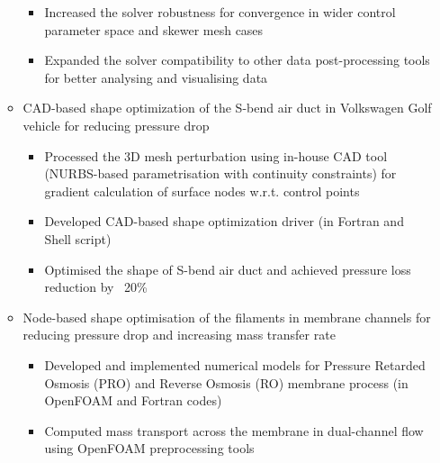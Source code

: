 \documentclass[letterpaper]{article}
\begin{document}
\begin{itemize}
\begin{itemize}
\begin{itemize}
		\item Increased the solver robustness for convergence in wider control parameter space and skewer mesh cases
		\item Expanded the solver compatibility to other data post-processing tools for better analysing and visualising data
		\end{itemize}
		\item CAD-based shape optimization of the S-bend air duct in Volkswagen Golf vehicle for reducing pressure drop
		\begin{itemize}
		\item Processed the 3D mesh perturbation using in-house CAD tool (NURBS-based parametrisation with continuity constraints) for gradient calculation of surface nodes w.r.t. control points
		\item	Developed CAD-based shape optimization driver (in Fortran and Shell script)
		\item Optimised the shape of S-bend air duct and achieved pressure loss reduction by ~20\%%
		\end{itemize}
		
		
		\item	Node-based shape optimisation of the filaments in membrane channels for reducing pressure drop and increasing mass transfer rate
					\begin{itemize}
					\item Developed and implemented numerical models for Pressure Retarded Osmosis (PRO) and Reverse Osmosis (RO) membrane process (in OpenFOAM and Fortran codes)
					\item Computed mass transport across the membrane in dual-channel flow using OpenFOAM preprocessing tools
					

\end{itemize}
\end{itemize}
\end{itemize}
\end{document}
